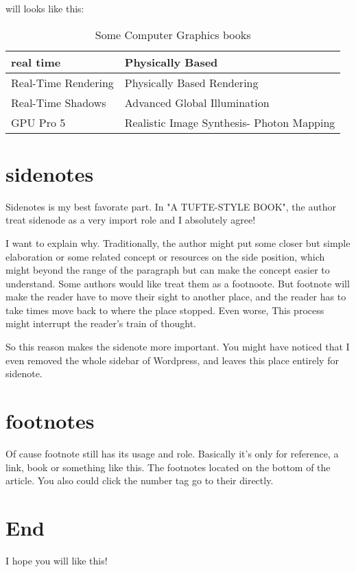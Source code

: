 will looks like this:

\begin{table}
    \begin{tabular}{|l|l|}
    \hline
    real time           & Physically Based                               \\ \hline
    Real-Time Rendering & Physically Based Rendering                     \\ \hline
    Real-Time Shadows   & Advanced Global Illumination                   \\ \hline
    GPU Pro 5           & Realistic Image Synthesis- Photon Mapping \\ \hline
    \end{tabular}
\caption{Some Computer Graphics books}
\end{table}

\section{sidenotes}
Sidenotes is my best favorate part. In "A TUFTE-STYLE BOOK", the author treat sidenode as a very import role and I absolutely agree!

I want to explain why. Traditionally, the author might put some closer but simple elaboration or some related concept or resources on the side position, which might beyond the range of the paragraph but can make the concept easier to understand. Some authors would like treat them as a footnoote. But footnote will make the reader have to move their sight to another place, and the reader\citet{b:implicit-surfaces} has to take times move back to where the place \citet{b:rts} stopped. Even worse, This process might interrupt the reader's train of \citet{b:pbrt} thought.  

So this reason makes the sidenote more important. You might have noticed that I even removed the whole sidebar of Wordpress, and leaves this place entirely for sidenote. 

\section{footnotes}

Of cause footnote still has its usage and role. Basically it's only for reference, a link, book or something like this. The footnotes located on the bottom of the article. You also could click the number tag go to their directly.

\section{End}
I hope you will like this!